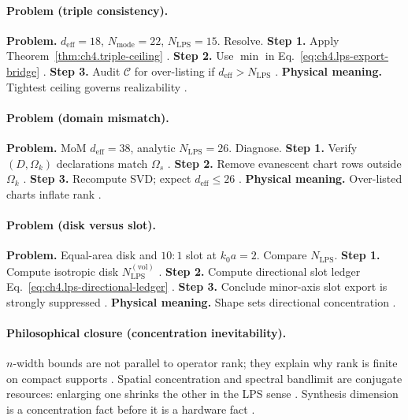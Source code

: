 \paragraph{Problem (triple consistency).}
\textbf{Problem.} \(d_{\mathrm{eff}}=18\), \(N_{\mathrm{mode}}=22\), \(N_{\mathrm{LPS}}=15\). Resolve.
\textbf{Step 1.} Apply Theorem~\ref{thm:ch4.triple-ceiling} \cite{hansen1988,stratton1941}.
\textbf{Step 2.} Use \(\min\) in Eq.~\eqref{eq:ch4.lps-export-bridge} \cite{harrington2001}.
\textbf{Step 3.} Audit \(\mathcal{C}\) for over-listing if \(d_{\mathrm{eff}}>N_{\mathrm{LPS}}\) \cite{devaney2004}.
\textbf{Physical meaning.} Tightest ceiling governs realizability \cite{stratton1941}.

\paragraph{Problem (domain mismatch).}
\textbf{Problem.} MoM \(d_{\mathrm{eff}}=38\), analytic \(N_{\mathrm{LPS}}=26\). Diagnose.
\textbf{Step 1.} Verify \((D,\Omega_{k})\) declarations match \(\Omega_{s}\) \cite{hansen1988,stratton1941}.
\textbf{Step 2.} Remove evanescent chart rows outside \(\Omega_{k}\) \cite{harrington2001,devaney2004}.
\textbf{Step 3.} Recompute SVD; expect \(d_{\mathrm{eff}}\le26\) \cite{jackson1999,hansen1988}.
\textbf{Physical meaning.} Over-listed charts inflate rank \cite{stratton1941}.

\paragraph{Problem (disk versus slot).}
\textbf{Problem.} Equal-area disk and \(10{:}1\) slot at \(k_{0}a=2\). Compare \(N_{\mathrm{LPS}}\).
\textbf{Step 1.} Compute isotropic disk \(N_{\mathrm{LPS}}^{(\mathrm{vol})}\) \cite{hansen1988,jackson1999}.
\textbf{Step 2.} Compute directional slot ledger Eq.~\eqref{eq:ch4.lps-directional-ledger} \cite{collin2001,stratton1941}.
\textbf{Step 3.} Conclude minor-axis slot export is strongly suppressed \cite{harrington2001}.
\textbf{Physical meaning.} Shape sets directional concentration \cite{hansen1988}.

\paragraph{Philosophical closure (concentration inevitability).}
\(n\)-width bounds are not parallel to operator rank; they explain why rank is finite on compact supports \cite{hansen1988,stratton1941,harrington2001}.
Spatial concentration and spectral bandlimit are conjugate resources: enlarging one shrinks the other in the LPS sense \cite{jackson1999,devaney2004}.
Synthesis dimension is a concentration fact before it is a hardware fact \cite{harrington2001,stratton1941}.

